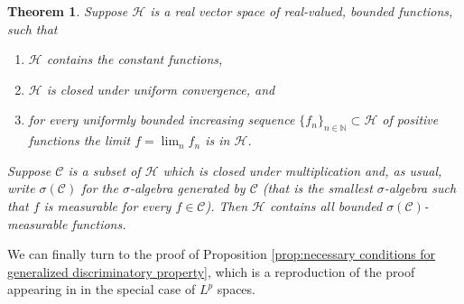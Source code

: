 \documentclass[11pt,a4paper,twoside,openany]{report}
\numberwithin{equation}{section}
\theoremstyle{plain} %
\newtheorem{theorem}{Theorem}[section]
\theoremstyle{definition} %
\theoremstyle{remark} %
\let\parencite\authnumparencite
\begin{document}
\begin{theorem}\label{thm:Monotone class}
    Suppose \( \mathcal{H} \) is a real vector space of real-valued, bounded functions, such that
\begin{enumerate}[label=(\roman*)]
  \item \( \mathcal{H} \) contains the constant functions,
  \item \( \mathcal{H} \) is closed under uniform convergence, and
  \item for every uniformly bounded increasing sequence \( \{f_n\}_{n\in\mathbb{N}}\subset\mathcal{H} \) of positive
  functions the limit \( f=\lim_{n} f_n \) is in \( \mathcal{H} \).
\end{enumerate}
Suppose \( \mathcal{C} \) is a subset of \( \mathcal{H} \) which is closed under multiplication and, as usual, write \( \sigma(\mathcal{C}) \) for
the \( \sigma \)-algebra generated by \( \mathcal{C} \) (that is the smallest \( \sigma \)-algebra such that \( f \) is measurable
for every \( f\in \mathcal{C} \)). Then \( \mathcal{H} \) contains all bounded \( \sigma(\mathcal{C}) \)-measurable functions.
\end{theorem}
We can finally turn to the proof of Proposition \ref{prop:necessary conditions for generalized discriminatory property}, which is a reproduction of the proof appearing in \parencite[Prop.~5.15.]{Arandjelovic2025} in the special case of \(L^p\) spaces.
\end{document}
